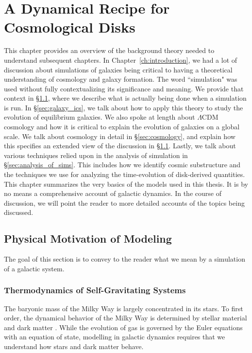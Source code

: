 \newcommand{\deriv}[3][]{%
  \ensuremath{\frac{\partial^{#1} {#2}}{\partial {#3}^{#1}}}}

\chapter{A Dynamical Recipe for Cosmological Disks}\label{ch:background}

This chapter provides an overview of the background theory needed to understand subsequent chapters. In Chapter~\ref{ch:introduction}, we had a lot of discussion about simulations of galaxies being critical to having a theoretical understanding of cosmology and galaxy formation. The word ``simulation" was used without fully contextualizing its significance and meaning. We provide that context in \S\ref{sec:motivation}, where we describe what is actually being done when a simulation is run. In \S\ref{sec:galaxy_ics}, we talk about how to apply this theory to study the evolution of equilibrium galaxies. We also spoke at length about $\Lambda$CDM cosmology and how it is critical to explain the evolution of galaxies on a global scale. We talk about cosmology in detail in \S\ref{sec:cosmology}, and explain how this specifies an extended view of the discussion in \S\ref{sec:motivation}. Lastly, we talk about various techniques relied upon in the analysis of simulation in \S\ref{sec:analysis_of_sims}. This includes how we identify cosmic substructure and the techniques we use for analyzing the time-evolution of disk-derived quantities. This chapter summarizes the very basics of the models used in this thesis. It is by no means a comprehensive account of galactic dynamics. In the course of discussion, we will point the reader to more detailed accounts of the topics being discussed.

\section{Physical Motivation of Modeling} \label{sec:motivation}

The goal of this section is to convey to the reader what we mean by a simulation of a galactic system. 

\subsection{Thermodynamics of Self-Gravitating Systems}

The baryonic mass of the Milky Way is largely concentrated in its stars. To first order, the dynamical behavior of the Milky Way is determined by stellar material and dark matter \citep{BM}. While the evolution of gas is governed by the Euler equations with an equation of state, modelling in galactic dynamics requires that we understand how stars and dark matter behave. 

